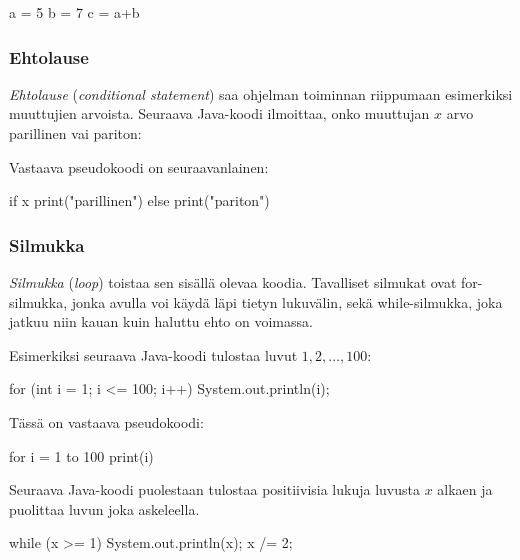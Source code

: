 \begin{code}
a = 5
b = 7
c = a+b
\end{code}

\subsubsection{Ehtolause}

\emph{Ehtolause} (\emph{conditional statement}) saa ohjelman
toiminnan riippumaan esimerkiksi muuttujien arvoista.
Seuraava Java-koodi ilmoittaa, onko muuttujan $x$ arvo parillinen vai pariton:


Vastaava pseudokoodi on seuraavanlainen:

\begin{code}
if x%
    print("parillinen")
else
    print("pariton")
\end{code}

\subsubsection{Silmukka}

\emph{Silmukka} (\emph{loop}) toistaa sen sisällä olevaa koodia.
Tavalliset silmukat ovat for-silmukka,
jonka avulla voi käydä läpi tietyn lukuvälin,
sekä while-silmukka,
joka jatkuu niin kauan kuin haluttu ehto on voimassa.

Esimerkiksi seuraava Java-koodi tulostaa luvut $1,2,\dots,100$:

\begin{code}
for (int i = 1; i <= 100; i++) {
    System.out.println(i);
}
\end{code}

Tässä on vastaava pseudokoodi:

\begin{code}
for i = 1 to 100
    print(i)
\end{code}

Seuraava Java-koodi puolestaan tulostaa positiivisia lukuja luvusta $x$ alkaen
ja puolittaa luvun joka askeleella.

\begin{code}
while (x >= 1) {
    System.out.println(x);
    x /= 2;
}
\end{code}

